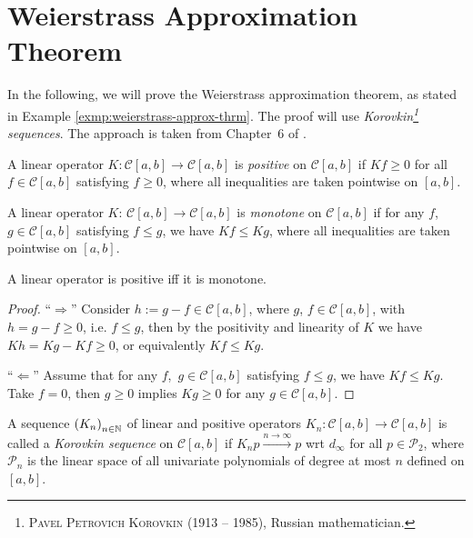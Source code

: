 \section{Weierstrass Approximation Theorem}\label{app:weierstrass-app-theorem}

In the following, we will prove the Weierstrass approximation theorem, as stated in Example \ref{exmp:weierstrass-approx-thrm}. The proof will use \textit{Korovkin\footnote{\textsc{Pavel Petrovich Korovkin} (1913 -- 1985), Russian mathematician.} sequences}. The approach is taken from \mbox{Chapter 6} of \cite{iske:approximation}.

\begin{defn}\label{defn:positivity-operator}
	A linear operator $K: \mathcal C[a, b] \to \mathcal C[a, b]$ is \textit{positive} on $\mathcal C[a, b]$ if $Kf \geq 0$ for all $f\in \mathcal C[a, b]$ satisfying $f\geq 0$, where all inequalities are taken pointwise on $[a, b]$.
\end{defn}

\begin{defn}\label{defn:monotonicity-operator}
	A linear operator $K$: $\mathcal C[a, b] \to \mathcal C[a, b]$ is \textit{monotone} on $\mathcal C[a, b]$ if for any \mbox{$f$, $g\in\mathcal C[a, b]$} satisfying $f\leq g$, we have $Kf \leq Kg$, where all inequalities are taken pointwise on $[a, b]$.
\end{defn}

\begin{remark}
	A linear operator is positive iff it is monotone.
\end{remark}

\begin{proof}
	\enquote{$\Longrightarrow$} Consider $h := g - f \in \mathcal C[a, b]$, where $g$, $f\in\mathcal C[a, b]$, with $h = g -f \geq 0$, i.e. $f\leq g$, then by the positivity and linearity of $K$ we have $Kh = Kg - Kf\geq 0$, or equivalently $Kf \leq Kg$.
	
	\enquote{$\Longleftarrow$} Assume that for any \mbox{$f$, $g\in\mathcal C[a, b]$} satisfying $f\leq g$, we have $Kf \leq Kg$. Take $f = 0$, then $g\geq 0$ implies $Kg \geq 0$ for any $g\in\mathcal C[a, b]$.
\end{proof}

\begin{defn}\label{defn:Korovkin_sequence}
	A sequence $\seq[K_n]$ of linear and positive operators $K_n: \mathcal C[a, b]\to\mathcal C[a, b]$ is called a \textit{Korovkin sequence} on $\mathcal C[a, b]$ if $K_np \overset{n\to\infty}{\longrightarrow}p$ wrt $d_{\infty}$ for all $p\in \mathcal P_{2}$, where $\mathcal P_n$ is the linear space of all univariate polynomials of degree at most $n$ defined on $[a, b]$.
\end{defn}

